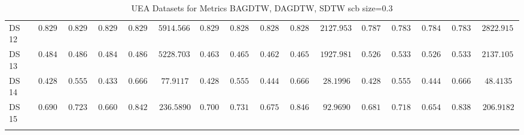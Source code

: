 {\begin{longtable}{|l|ccccc|ccccc|ccccc|}
		DS 12 & $0.8298$ & $0.8291$ & $0.8294$ & $0.8291$ & $5914.5661$ & $0.8298$ & $0.8281$ & $0.8287$ & $0.8281$ & $2127.9539$ & $0.7872$ & $0.7839$ & $0.7841$ & $0.7839$ & $2822.9156$ \\
		DS 13 & $0.4842$ & $0.4866$ & $0.4840$ & $0.4866$ & $5228.7036$ & $0.4632$ & $0.4653$ & $0.4629$ & $0.4653$ & $1927.9817$ & $0.5263$ & $\boldsymbol{0.5331}$ & $\boldsymbol{0.5261}$ & $\boldsymbol{0.5331}$ & $2137.1052$ \\
		DS 14 & $0.4286$ & $0.5556$ & $0.4333$ & $0.6667$ & $77.9117$ & $0.4286$ & $0.5556$ & $0.4444$ & $0.6667$ & $28.1996$ & $0.4286$ & $0.5556$ & $0.4444$ & $0.6667$ & $48.4135$ \\
		DS 15 & $0.6909$ & $0.7239$ & $0.6601$ & $0.8422$ & $236.5890$ & $\boldsymbol{0.7000}$ & $\boldsymbol{0.7317}$ & $\boldsymbol{0.6751}$ & $\boldsymbol{0.8467}$ & $92.9690$ & $0.6818$ & $0.7181$ & $0.6548$ & $0.8389$ & $206.9182$ \\
		\hline
		\caption{UEA Datasets for Metrics BAGDTW, DAGDTW, SDTW \gls{scb} size=0.3}
		\label{tab:UEA_bagdtw-dagdtw-sdtw_scb_size=0.3}
	\end{longtable}
}
